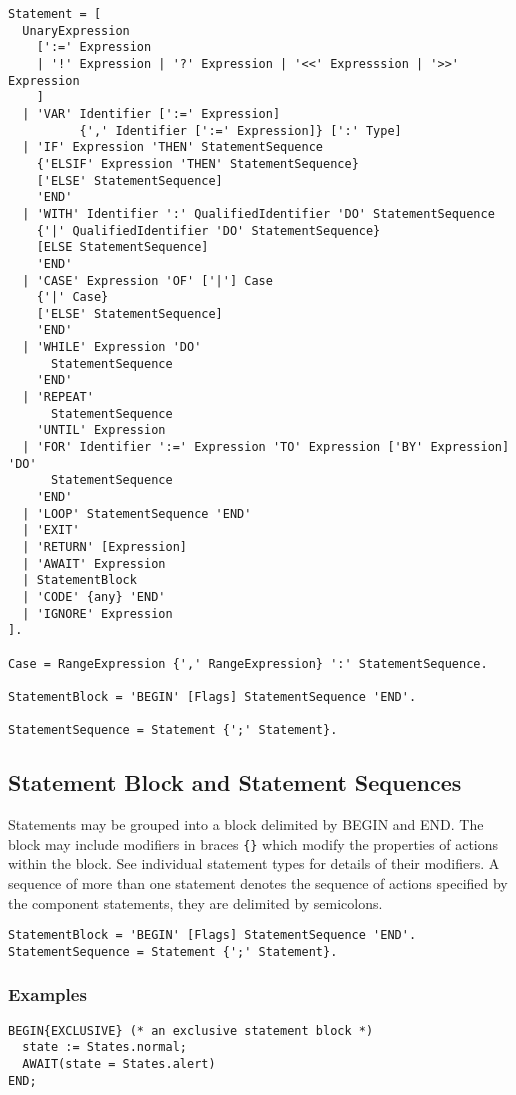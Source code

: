\documentclass[a4wide,11pt]{article}
\begin{document}
\begin{lstlisting}[style=ebnf]
Statement = [
  UnaryExpression
    [':=' Expression
    | '!' Expression | '?' Expression | '<<' Expresssion | '>>' Expression
    ]
  | 'VAR' Identifier [':=' Expression]
          {',' Identifier [':=' Expression]} [':' Type]
  | 'IF' Expression 'THEN' StatementSequence
    {'ELSIF' Expression 'THEN' StatementSequence}
    ['ELSE' StatementSequence]
    'END'
  | 'WITH' Identifier ':' QualifiedIdentifier 'DO' StatementSequence
    {'|' QualifiedIdentifier 'DO' StatementSequence}
    [ELSE StatementSequence]
    'END'
  | 'CASE' Expression 'OF' ['|'] Case
    {'|' Case}
    ['ELSE' StatementSequence]
    'END'
  | 'WHILE' Expression 'DO'
      StatementSequence
    'END'
  | 'REPEAT'
      StatementSequence
    'UNTIL' Expression
  | 'FOR' Identifier ':=' Expression 'TO' Expression ['BY' Expression] 'DO'
      StatementSequence
    'END'
  | 'LOOP' StatementSequence 'END'
  | 'EXIT'
  | 'RETURN' [Expression]
  | 'AWAIT' Expression
  | StatementBlock
  | 'CODE' {any} 'END'
  | 'IGNORE' Expression
].

Case = RangeExpression {',' RangeExpression} ':' StatementSequence.

StatementBlock = 'BEGIN' [Flags] StatementSequence 'END'.

StatementSequence = Statement {';' Statement}.
\end{lstlisting}

\subsection{Statement Block and Statement Sequences}
Statements may be grouped into a block delimited by BEGIN and END.
The block may include modifiers in braces \lstinline"{}"  which modify the properties of actions within the block.
See individual statement types for details of their modifiers.
A sequence of  more than one statement denotes the sequence of actions specified by the component statements, they are delimited by semicolons.

\begin{lstlisting}[style=ebnf]
StatementBlock = 'BEGIN' [Flags] StatementSequence 'END'.
StatementSequence = Statement {';' Statement}.
\end{lstlisting}

\begin{annotation}
\subsubsection{Examples}
\begin{lstlisting}[style=example]
BEGIN{EXCLUSIVE} (* an exclusive statement block *)
  state := States.normal;
  AWAIT(state = States.alert)
END;
\end{lstlisting}
\end{annotation}
\end{document}
